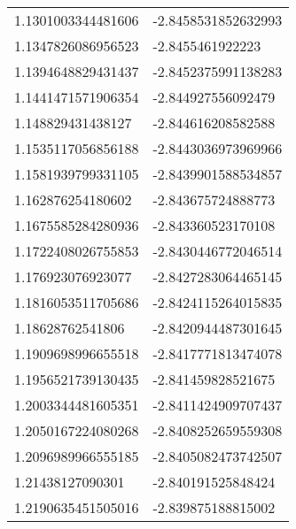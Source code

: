 \begin{supertabular}{ll}
1.1301003344481606  & -2.8458531852632993  \\
1.1347826086956523  & -2.8455461922223     \\
1.1394648829431437  & -2.8452375991138283  \\
1.1441471571906354  & -2.844927556092479   \\
1.148829431438127   & -2.844616208582588   \\
1.1535117056856188  & -2.8443036973969966  \\
1.1581939799331105  & -2.8439901588534857  \\
1.162876254180602   & -2.843675724888773   \\
1.1675585284280936  & -2.843360523170108   \\
1.1722408026755853  & -2.8430446772046514  \\
1.176923076923077   & -2.8427283064465145  \\
1.1816053511705686  & -2.8424115264015835  \\
1.18628762541806    & -2.8420944487301645  \\
1.1909698996655518  & -2.8417771813474078  \\
1.1956521739130435  & -2.841459828521675   \\
1.2003344481605351  & -2.8411424909707437  \\
1.2050167224080268  & -2.8408252659559308  \\
1.2096989966555185  & -2.8405082473742507  \\
1.21438127090301    & -2.840191525848424   \\
1.2190635451505016  & -2.839875188815002   \\
\end{supertabular}
